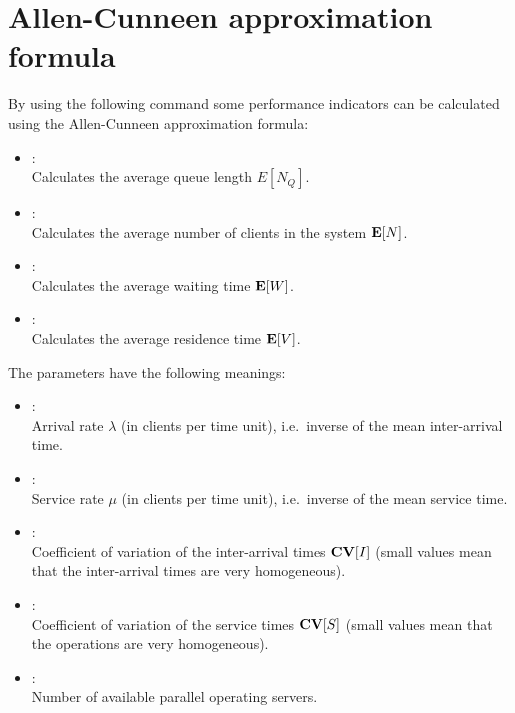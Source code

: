 \chapter{Allen-Cunneen approximation formula}

By using the following command some performance indicators can be calculated
using the Allen-Cunneen approximation formula:

\begin{itemize}

\item
{}:\\
Calculates the average queue length $E[N_Q]$. 

\item
{}:\\
Calculates the average number of clients in the system ${\bf E}[N]$.

\item
{}:\\
Calculates the average waiting time ${\bf E}[W]$.

\item
{}:\\
Calculates the average residence time ${\bf E}[V]$.
\end{itemize}

The parameters have the following meanings:
\begin{itemize}
\item
{}:\\
Arrival rate $\lambda$ (in clients per time unit), i.e.\ inverse of the mean inter-arrival time.
\item
{}:\\
Service rate $\mu$ (in clients per time unit), i.e.\ inverse of the mean service time.
\item
{}:\\
Coefficient of variation of the inter-arrival times ${\bf CV}[I]$ (small values mean that the inter-arrival times are very homogeneous).
\item
{}:\\
Coefficient of variation of the service times ${\bf CV}[S]$ (small values mean that the operations are very homogeneous).
\item
{}:\\
Number of available parallel operating servers.
\end{itemize}